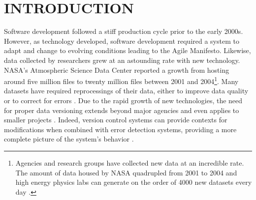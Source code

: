 
\chapter{INTRODUCTION}

Software development followed a stiff production cycle prior to the early 2000s.
However, as technology developed, software development required a system to adapt and change to evolving conditions leading to the Agile Manifesto.
Likewise, data collected by researchers grew at an astounding rate with new technology.
NASA's Atmospheric Science Data Center reported a growth from hosting around five million files to twenty million files between 2001 and 2004\footnote{Agencies and research groups have collected new data at an incredible rate.
The amount of data housed by NASA quadrupled from 2001 to 2004 \cite{Barkstrom_digitallibrary} and high energy physics labs can generate on the order of 4000 new datasets every day \cite{Flouris04clotho:transparent}.}.
Many datasets have required reprocessings of their data, either to improve data quality or to correct for errors \cite{barkstrom2014earth}.
Due to the rapid growth of new technologies, the need for proper data versioning extends beyond major agencies and even applies to smaller projects \cite{burrows2006review} \cite{Tagger2005} \cite{Stuckenholz:2005:CEV:1039174.1039197}.
Indeed, version control systems can provide contexts for modifications when combined with error detection systems, providing a more complete picture of the system's behavior \cite{Fischer2003}.


